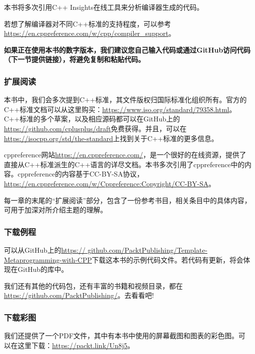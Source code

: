 本书将多次引用C++ Insights在线工具来分析编译器生成的代码。

若想了解编译器对不同C++标准的支持程度，可以参考\url{https://en.cppreference.com/w/cpp/compiler\_support}。

\textbf{
如果正在使用本书的数字版本，我们建议您自己输入代码或通过GitHub访问代码（下一节提供链接），将避免复制和粘贴代码。
}

\subsubsection{扩展阅读}

本书中，我们会多次提到C++标准，其文件版权归国际标准化组织所有。官方的C++标准文档可以从这里购买：\url{https://www.iso.org/standard/79358.html}。C++标准的多个草案，以及相应源码都可以在GitHub上的\url{https://github.com/cplusplus/draft}免费获得。并且，可以在\url{https://isocpp.org/std/the-standard}上找到关于C++标准的更多信息。

cppreference网站\url{https://en.cppreference.com/}，是一个很好的在线资源，提供了直接从C++标准派生的C++语言的详尽文档。本书多次引用了cppreference中的内容。cppreference的内容基于CC-BY-SA协议，\url{https://en.cppreference.com/w/Cppreference:Copyright/CC-BY-SA}。

每一章的末尾的“扩展阅读”部分，包含了一份参考书目，相关条目中的具体内容，可用于加深对所介绍主题的理解。

\subsubsection{下载例程}

可以从GitHub上的\url{https:// github.com/PacktPublishing/Template-Metaprogramming-with-CPP}下载这本书的示例代码文件。若代码有更新，将会体现在GitHub的库中。

我们还有其他的代码包，还有丰富的书籍和视频目录，都在\url{https://github.com/PacktPublishing/}。去看看吧!


\subsubsection{下载彩图}

我们还提供了一个PDF文件，其中有本书中使用的屏幕截图和图表的彩色图。可以在这里下载：\url{https://packt.link/Un8j5}。








